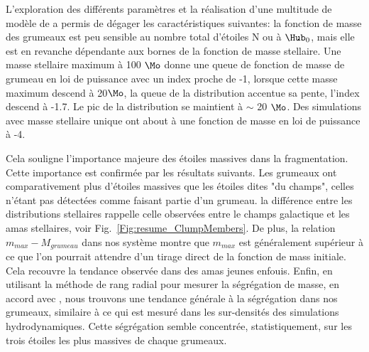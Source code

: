 L'exploration des diff\'erents param\`etres et la r\'ealisation d'une multitude de mod\`ele de \HubLem a permis de d\'egager les caract\'eristiques suivantes: la fonction de masse des grumeaux est peu sensible au nombre total d'\'etoiles N ou \`a $\Hub_0$, mais elle est en revanche d\'ependante aux bornes de la fonction de masse stellaire. Une masse stellaire maximum \`a 100 $\Mo$ donne une queue de fonction de masse de grumeau en loi de puissance avec un index proche de -1, lorsque cette masse maximum descend \`a 20$\Mo$, la queue de la distribution accentue sa pente, l'index descend \`a -1.7. Le pic de la distribution se maintient \`a $\sim$ 20 $\Mo$. Des simulations avec masse stellaire unique ont about \`a une fonction de masse en loi de puissance à -4.

Cela souligne l'importance majeure des \'etoiles massives dans la fragmentation. Cette importance est confirm\'ee par les r\'esultats suivants. Les grumeaux ont comparativement plus d'\'etoiles massives que les \'etoiles dites "du champs", celles n'\'etant pas d\'etect\'ees comme faisant partie d'un grumeau. la diff\'erence entre les distributions stellaires rappelle celle observ\'ees entre le champs galactique et les amas stellaires, voir Fig.~\ref{Fig:resume_ClumpMembers}. De plus, la relation  $m_{max} - M_{grumeau}$ dans nos syst\`eme montre que $m_{max}$ est généralement supérieur à ce que l'on pourrait attendre d'un tirage direct de la fonction de mass initiale. Cela recouvre la tendance observ\'ee dans des amas jeunes enfouis. Enfin, en utilisant la m\'ethode de rang radial pour mesurer la s\'egr\'egation de masse, en accord avec \cite{Maschberger2010}, nous trouvons une tendance g\'en\'erale \`a la s\'egr\'egation dans nos grumeaux, similaire \`a ce qui est mesur\'e dans les sur-densit\'es des simulations hydrodynamiques. Cette ségrégation semble concentrée, statistiquement, sur les trois étoiles les plus massives de chaque grumeaux.


